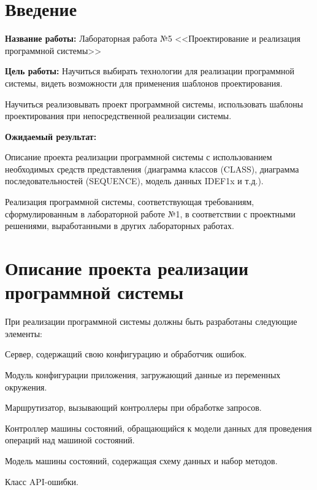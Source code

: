 \documentclass{hse_document}
\begin{document}

\tableofcontents
\clearpage

\section*{Введение} \label{Введение}

\textbf{Название работы:}
Лабораторная работа №5 <<Проектирование и реализация программной системы>>

\textbf{Цель работы:}
Научиться выбирать технологии для реализации программной системы, видеть возможности для применения шаблонов проектирования.

Научиться реализовывать проект программной системы, использовать шаблоны
проектирования при непосредственной реализации системы.

\textbf{Ожидаемый результат:}

Описание проекта реализации программной системы с использованием необходимых средств
представления (диаграмма классов (CLASS), диаграмма последовательностей (SEQUENCE),
модель данных IDEF1x и т.д.).

Реализация программной системы, соответствующая требованиям, сформулированным в
лабораторной работе №1, в соответствии с проектными решениями, выработанными в других
лабораторных работах.

\section{Описание проекта реализации программной системы}\label{sec:project}

При реализации программной системы должны быть разработаны следующие элементы:

\begin{compactenum}
\item Сервер, содержащий свою конфигурацию и обработчик ошибок.
\item Модуль конфигурации приложения, загружающий данные из переменных окружения.
\item Маршрутизатор, вызывающий контроллеры при обработке запросов.
\item Контроллер машины состояний, обращающийся к модели данных для проведения операций над машиной состояний.
\item Модель машины состояний, содержащая схему данных и набор методов.
\item Класс API-ошибки.
\end{compactenum}
\end{document}
